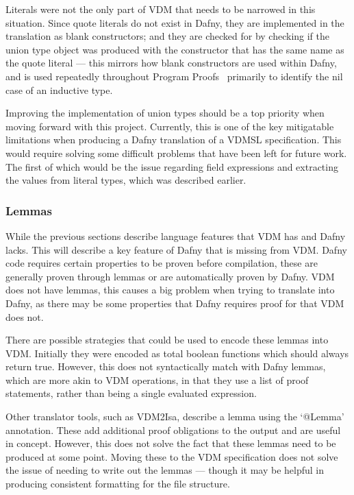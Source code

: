 \documentclass{entcs}
\begin{document}
Literals were not the only part of VDM that needs to be narrowed in this situation. Since quote literals do not exist in Dafny, they are implemented in the translation as blank constructors; and they are checked for by checking if the union type object was produced with the constructor that has the same name as the quote literal --- this mirrors how blank constructors are used within Dafny, and is used repeatedly throughout Program Proofs~\cite{ProgramProofs} primarily to identify the nil case of an inductive type.

Improving the implementation of union types should be a top priority when moving forward with this project. Currently, this is one of the key mitigatable limitations when producing a Dafny translation of a VDMSL specification. This would require solving some difficult problems that have been left for future work. The first of which would be the issue regarding field expressions and extracting the values from literal types, which was described earlier.

\subsubsection{Lemmas}\label{section:pog}

While the previous sections describe language features that VDM has and Dafny lacks. This will describe a key feature of Dafny that is missing from VDM. Dafny code requires certain properties to be proven before compilation, these are generally proven through lemmas or are automatically proven by Dafny. VDM does not have lemmas, this causes a big problem when trying to translate into Dafny, as there may be some properties that Dafny requires proof for that VDM does not. 

There are possible strategies that could be used to encode these lemmas into VDM. Initially they were encoded as total boolean functions which should always return true. However, this does not syntactically match with Dafny lemmas, which are more akin to VDM operations, in that they use a list of proof statements, rather than being a single evaluated expression. 

Other translator tools, such as VDM2Isa, describe a lemma using the `@Lemma' annotation. These add additional proof obligations to the output and are useful in concept. However, this does not solve the fact that these lemmas need to be produced at some point. Moving these to the VDM specification does not solve the issue of needing to write out the lemmas --- though it may be helpful in producing consistent formatting for the file structure.
\end{document}
